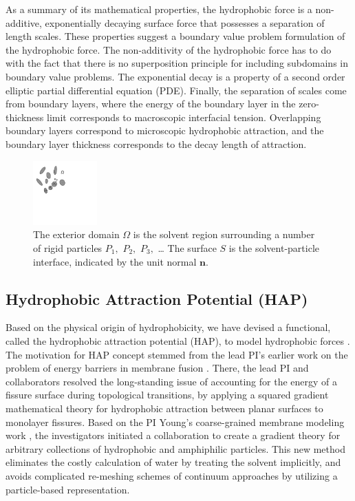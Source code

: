 As a summary of its mathematical properties,  the hydrophobic force
is a non-additive, exponentially decaying surface force 
that possesses a separation of length scales. These properties suggest 
a boundary value problem formulation of the hydrophobic force.  
The non-additivity of the hydrophobic force has to do with the fact that there is no superposition
principle for including subdomains in boundary value problems. 
The exponential decay is a property of a second order elliptic partial differential equation (PDE). 
Finally, the separation of scales come from boundary layers, 
where the energy of the boundary layer in the zero-thickness limit corresponds to macroscopic interfacial tension.
Overlapping boundary layers correspond to microscopic hydrophobic attraction, 
and the boundary layer thickness corresponds to the decay length of attraction.

\begin{figure}
\centerline{\includegraphics[width=0.22\textwidth]{figures/BG_fig1.pdf}}
\caption{The exterior domain $\Omega$ is the solvent region surrounding a
number of rigid particles $P_1,$ $P_2,$ $P_3,$ \dots 
The surface $S$ is the solvent-particle interface, indicated by the unit
normal $\mathbf{n}.$ }\label{fig:domain}
\end{figure}
\subsection{Hydrophobic Attraction Potential (HAP)}
\label{sec:HAP}

Based on the physical origin of hydrophobicity,  we have devised a functional, called the hydrophobic attraction potential (HAP), to
model hydrophobic forces \cite{Fu19}. The motivation for HAP concept stemmed from the lead PI's 
earlier work on the problem of energy barriers in membrane fusion \cite{RyKlYaCo16,Chetal16}.
There, the lead PI and collaborators resolved the long-standing issue of accounting for the energy of a fissure surface
during topological transitions, by applying a squared gradient mathematical theory 
for hydrophobic attraction between planar surfaces \cite{Eriksson1989,Lum1999,Menshikov2017,Marcelja1977} to monolayer fissures.
Based on the PI Young's coarse-grained membrane modeling work \cite{Fu2017}, 
the investigators initiated a collaboration to create a gradient theory for arbitrary collections 
of hydrophobic and amphiphilic particles. This new method 
eliminates the costly calculation of water by treating the solvent implicitly, 
and avoids complicated re-meshing schemes of continuum approaches
by utilizing a particle-based representation.

